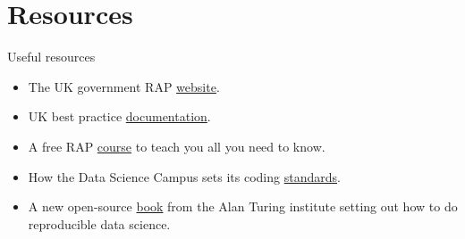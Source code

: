 \documentclass[xcolor=x11names,compress]{beamer}
\renewcommand{\(}{\begin{columns}}
\renewcommand{\)}{\end{columns}}
\newcommand{\<}[1]{\begin{column}{#1}}
\renewcommand{\>}{\end{column}}
\begin{document}
\section{Resources}
\begin{frame}{Useful resources}
  \begin{itemize}
    \item The UK government RAP \href{https://ukgovdatascience.github.io/rap-website/index.html}{website}.
    \item UK best practice \href{https://gss.civilservice.gov.uk/policy-store/quality-statistics-in-government/\#reproducible-analytical-pipelines-rap-}{documentation}.
    \item A free RAP \href{https://www.udemy.com/course/reproducible-analytical-pipelines/}{course} to teach you all you need to know.
    \item How the Data Science Campus sets its coding \href{https://datasciencecampus.github.io/coding-standards/}{standards}.
    \item A new open-source \href{https://the-turing-way.netlify.com}{book} from the Alan Turing institute setting out how to do reproducible data science.
  \end{itemize}
\end{frame}
\end{document}
